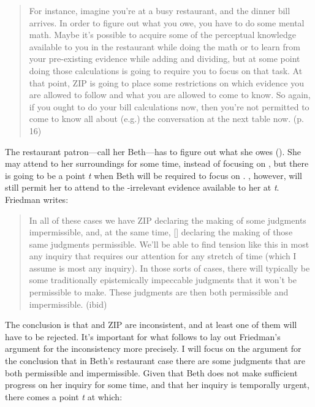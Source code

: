 \documentclass[12pt]{article}
\begin{document}
\begin{quote}
    For instance, imagine you're at a busy restaurant, and the dinner bill arrives. In order to figure out what you owe, you have to do some mental math. Maybe it’s possible to acquire some of the perceptual knowledge available to you in the restaurant while doing the math or to learn from your pre-existing evidence while adding and dividing, but at some point doing those calculations is going to require you to focus on that task. At that point, ZIP is going to place some restrictions on which evidence you are allowed to follow and what you are allowed to come to know. So again, if you ought to do your bill calculations now, then you’re not permitted to come to know all about (e.g.) the conversation at the next table now. (p. 16)
\end{quote}
%
The restaurant patron---call her Beth---has to figure out what she owes (). She may attend to her surroundings for some time, instead of focusing on , but there is going to be a point \textit{t} when Beth will be required to focus on . \ep{}, however, will still permit her to attend to the -irrelevant evidence available to her at \textit{t}. Friedman writes:

\begin{quote}
    In all of these cases we have ZIP declaring the making of some judgments impermissible, and, at the same time, [\ep{}] declaring the making of those same judgments permissible. We’ll be able to find tension like this in most any inquiry that requires our attention for any stretch of time (which I assume is most any inquiry). In those sorts of cases, there will typically be some traditionally epistemically impeccable judgments that it won’t be permissible to make. These judgments are then both permissible and impermissible. (ibid)
\end{quote}
%
The conclusion is that \ep{} and ZIP are inconsistent, and at least one of them will have to be rejected. It's important for what follows to lay out Friedman's argument for the inconsistency more precisely. I will focus on the argument for the conclusion that in Beth's restaurant case there are some judgments that are both permissible and impermissible. Given that Beth does not make sufficient progress on her inquiry  for some time, and that her inquiry is temporally urgent, there comes a point \textit{t} at which:
\end{document}

